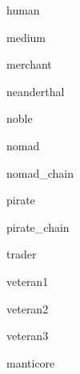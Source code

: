 \documentclass[letterpaper,serif]{module}
\begin{document}
\begin{newmonster}{human}\end{newmonster}

\begin{newmonster}{medium}\end{newmonster}

\begin{newmonster}{merchant}\end{newmonster}

\begin{newmonster}{neanderthal}\end{newmonster}

\begin{newmonster}{noble}\end{newmonster}

\begin{newmonster}{nomad}\end{newmonster}

\begin{newmonster}{nomad_chain}\end{newmonster}

\begin{newmonster}{pirate}\end{newmonster}

\begin{newmonster}{pirate_chain}\end{newmonster}

\begin{newmonster}{trader}\end{newmonster}

\begin{newmonster}{veteran1}\end{newmonster}

\begin{newmonster}{veteran2}\end{newmonster}

\begin{newmonster}{veteran3}\end{newmonster}

\begin{newmonster}{manticore}\end{newmonster}
\end{document}
